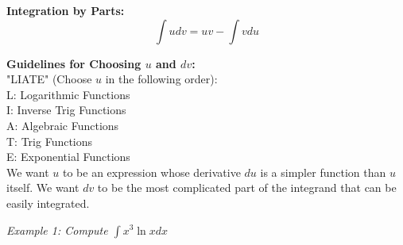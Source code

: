         \noindent \color{purple} \textbf{Integration by Parts:} \color{black} \\

        \begin{equation*}
            \int udv = uv - \int v du
        \end{equation*}

        \noindent \textbf{Guidelines for Choosing $u$ and $dv$:} \\
        \noindent "LIATE" (Choose $u$ in the following order): \\
        \noindent L: Logarithmic Functions \\
        \noindent I: Inverse Trig Functions \\
        \noindent A: Algebraic Functions \\
        \noindent T: Trig Functions \\
        \noindent E: Exponential Functions \\

        \noindent We want $u$ to be an expression whose derivative $du$ is a simpler function
        than $u$ itself. We want $dv$ to be the most complicated part of the integrand that
        can be easily integrated.

        \pagebreak
        \noindent \color{blue} \textit{Example 1: Compute $\int x^3\ln{x}dx$} \color{black}

